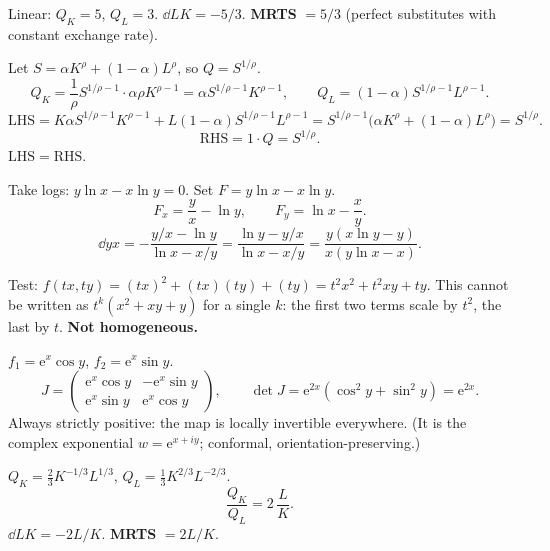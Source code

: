 \begin{solutions}
  \item Linear: $Q_{K}=5$, $Q_{L}=3$. $\dd{L}{K}=-5/3$. \textbf{MRTS}
        $=5/3$ (perfect substitutes with constant exchange rate).

  \item Let $S=\alpha K^{\rho}+(1-\alpha)L^{\rho}$, so $Q=S^{1/\rho}$.
        \[
          Q_{K}=\frac{1}{\rho}S^{1/\rho-1}\cdot\alpha\rho K^{\rho-1}
            =\alpha S^{1/\rho-1}K^{\rho-1},\qquad
          Q_{L}=(1-\alpha)S^{1/\rho-1}L^{\rho-1} .
        \]
        \[
          \mathrm{LHS}=K\alpha S^{1/\rho-1}K^{\rho-1}
            +L(1-\alpha)S^{1/\rho-1}L^{\rho-1}
            =S^{1/\rho-1}\bigl(\alpha K^{\rho}+(1-\alpha)L^{\rho}\bigr)
            =S^{1/\rho} .
        \]
        \[
          \mathrm{RHS}=1\cdot Q=S^{1/\rho} .
        \]
        $\mathrm{LHS}=\mathrm{RHS}$. \checkmark

  \item Take logs: $y\ln x-x\ln y=0$. Set $F=y\ln x-x\ln y$.
        \[
          F_{x}=\frac{y}{x}-\ln y,\qquad F_{y}=\ln x-\frac{x}{y} .
        \]
        \[
          \dd{y}{x} = -\frac{y/x-\ln y}{\ln x-x/y}
            = \frac{\ln y-y/x}{\ln x-x/y}
            = \frac{y(x\ln y-y)}{x(y\ln x-x)} .
        \]

  \item Test: $f(tx,ty)=(tx)^{2}+(tx)(ty)+(ty)=t^{2}x^{2}+t^{2}xy+ty$.
        This cannot be written as $t^{k}(x^{2}+xy+y)$ for a single $k$:
        the first two terms scale by $t^{2}$, the last by $t$.
        \textbf{Not homogeneous.}

  \item $f_{1}=\mathrm{e}^{x}\cos y$, $f_{2}=\mathrm{e}^{x}\sin y$.
        \[
          J=\begin{pmatrix} \mathrm{e}^{x}\cos y & -\mathrm{e}^{x}\sin y\\
                             \mathrm{e}^{x}\sin y & \mathrm{e}^{x}\cos y
            \end{pmatrix},\qquad
          \det J=\mathrm{e}^{2x}(\cos^{2}y+\sin^{2}y)=\mathrm{e}^{2x} .
        \]
        Always strictly positive: the map is locally invertible
        everywhere. (It is the complex exponential $w=\mathrm{e}^{x+iy}$;
        conformal, orientation-preserving.)

  \item $Q_{K}=\tfrac23K^{-1/3}L^{1/3}$, $Q_{L}=\tfrac13K^{2/3}L^{-2/3}$.
        \[
          \frac{Q_{K}}{Q_{L}}=2\,\frac{L}{K} .
        \]
        $\dd{L}{K}=-2L/K$. \textbf{MRTS} $=2L/K$.


\end{solutions}
